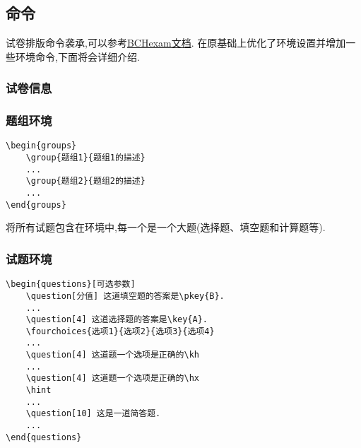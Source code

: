 \documentclass[list,answers,csize4,custom]{sysuexam}
\begin{document}
\subsection{命令}
试卷排版命令袭承\href{https://github.com/mathedu4all/bhcexam}{},可以参考\href{http://docs.mathcrowd.cn/advances/bhcexam.html}{BCHexam文档}. 在原基础上优化了环境设置并增加一些环境命令,下面将会详细介绍.

\subsubsection{试卷信息}

\subsubsection{题组环境}
\begin{verbatim}
\begin{groups}
    \group{题组1}{题组1的描述}
    ...
    \group{题组2}{题组2的描述}
    ...
\end{groups}
\end{verbatim}

将所有试题包含在环境中,每一个是一个大题(选择题、填空题和计算题等).

\subsubsection{试题环境}
\begin{verbatim}
\begin{questions}[可选参数]
    \question[分值] 这道填空题的答案是\pkey{B}.
    ...
    \question[4] 这道选择题的答案是\key{A}.
    \fourchoices{选项1}{选项2}{选项3}{选项4}
    ...
    \question[4] 这道题一个选项是正确的\kh
    ...
    \question[4] 这道题一个选项是正确的\hx
    \hint
    ...
    \question[10] 这是一道简答题.
    ...
\end{questions}
\end{verbatim}
\end{document}
